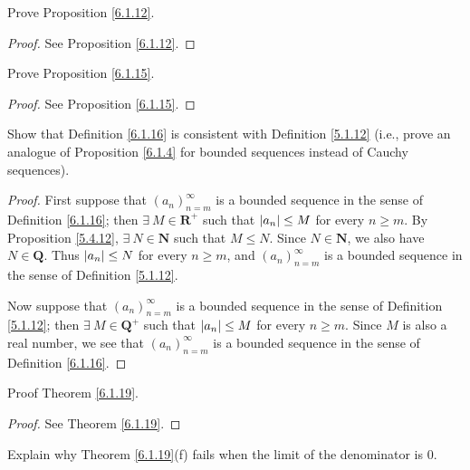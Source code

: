 \begin{exercise}\label{ex 6.1.5}
    Prove Proposition \ref{6.1.12}.
\end{exercise}

\begin{proof}
    See Proposition \ref{6.1.12}.
\end{proof}

\begin{exercise}\label{ex 6.1.6}
    Prove Proposition \ref{6.1.15}.
\end{exercise}

\begin{proof}
    See Proposition \ref{6.1.15}.
\end{proof}

\begin{exercise}\label{ex 6.1.7}
    Show that Definition \ref{6.1.16} is consistent with Definition \ref{5.1.12}
    (i.e., prove an analogue of Proposition \ref{6.1.4} for bounded sequences instead of Cauchy sequences).
\end{exercise}

\begin{proof}
    First suppose that \((a_n)_{n = m}^\infty\) is a bounded sequence in the sense of Definition \ref{6.1.16};
    then \(\exists\ M \in \mathbf{R}^+\) such that \(\abs*{a_n} \leq M\) for every \(n \geq m\).
    By Proposition \ref{5.4.12}, \(\exists\ N \in \mathbf{N}\) such that \(M \leq N\).
    Since \(N \in \mathbf{N}\), we also have \(N \in \mathbf{Q}\).
    Thus \(\abs*{a_n} \leq N\) for every \(n \geq m\), and \((a_n)_{n = m}^\infty\) is a bounded sequence in the sense of Definition \ref{5.1.12}.

    Now suppose that \((a_n)_{n = m}^\infty\) is a bounded sequence in the sense of Definition \ref{5.1.12};
    then \(\exists\ M \in \mathbf{Q}^+\) such that \(\abs*{a_n} \leq M\) for every \(n \geq m\).
    Since \(M\) is also a real number, we see that \((a_n)_{n = m}^\infty\) is a bounded sequence in the sense of Definition \ref{6.1.16}.
\end{proof}

\begin{exercise}\label{ex 6.1.8}
    Proof Theorem \ref{6.1.19}.
\end{exercise}

\begin{proof}
    See Theorem \ref{6.1.19}.
\end{proof}

\begin{exercise}\label{ex 6.1.9}
    Explain why Theorem \ref{6.1.19}(f) fails when the limit of the denominator is \(0\).
\end{exercise}


